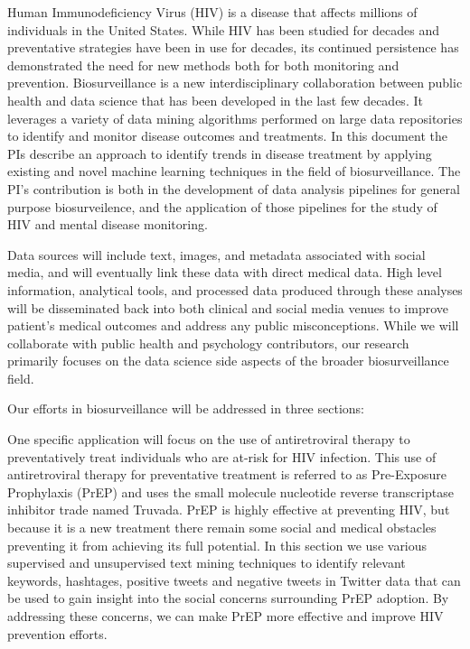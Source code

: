 


Human Immunodeficiency Virus (HIV) is a disease that affects millions of individuals in the United States. While HIV has been studied for decades and preventative strategies have been in use for decades, its continued persistence has demonstrated the need for new methods both for both monitoring and prevention. Biosurveillance is a new interdisciplinary collaboration between public health and data science that has been developed in the last few decades. It leverages a variety of data mining algorithms performed on large data repositories to identify and monitor disease outcomes and treatments. In this document the PIs describe an approach to identify trends in disease treatment by applying existing and novel machine learning techniques in the field of biosurveillance. The PI's contribution is both in the development of data analysis pipelines for general purpose biosurveilence, and the application of those pipelines for the study of HIV and mental disease monitoring.

Data sources will include text, images, and metadata associated with social media, and will eventually link these data with direct medical data. High level information, analytical tools, and processed data produced through these analyses will be disseminated back into both clinical and social media venues to improve patient's medical outcomes and address any public misconceptions. While we will collaborate with public health and psychology contributors, our research primarily focuses on the data science side aspects of the broader biosurveillance field.

Our efforts in biosurveillance will be addressed in three sections:

One specific application will focus on the use of antiretroviral therapy to preventatively treat individuals who are at-risk for HIV infection. This use of antiretroviral therapy for preventative treatment is referred to as Pre-Exposure Prophylaxis (PrEP) and uses the small molecule nucleotide reverse transcriptase inhibitor trade named Truvada. PrEP is highly effective at preventing HIV, but because it is a new treatment there remain some social and medical obstacles preventing it from achieving its full potential. In this section we use various supervised and unsupervised text mining techniques to identify relevant keywords, hashtages, positive tweets and negative tweets in Twitter data that can be used to gain insight into the social concerns surrounding PrEP adoption. By addressing these concerns, we can make PrEP more effective and improve HIV prevention efforts.

